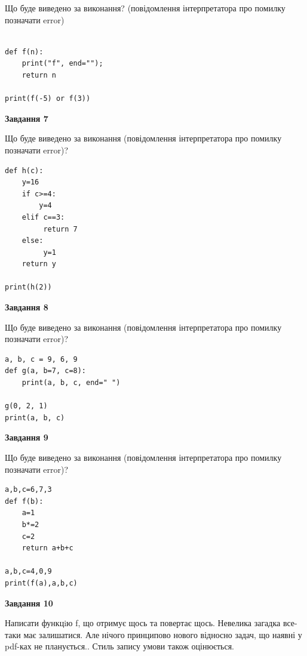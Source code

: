 \documentclass[12pt, ukrainian]{article}
\begin{document}
{\begin {large}
Що буде виведено за виконання? (повідомлення інтерпретатора про помилку позначати error)\par
\begin{verbatim}

def f(n):
    print("f", end="");
    return n

print(f(-5) or f(3))
\end{verbatim}

{\begin {center}\textbf{Завдання 7}\end {center}}

Що буде виведено за виконання (повідомлення інтерпретатора про помилку позначати error)?\par
\begin{verbatim}
def h(c):
    y=16
    if c>=4: 
        y=4
    elif c==3:
         return 7
    else:
         y=1
    return y

print(h(2))
\end{verbatim}

{\begin {center}\textbf{Завдання 8}\end {center}}

Що буде виведено за виконання (повідомлення інтерпретатора про помилку позначати error)?\par
\begin{verbatim}
a, b, c = 9, 6, 9
def g(a, b=7, c=8):
    print(a, b, c, end=" ")

g(0, 2, 1)
print(a, b, c)
\end{verbatim}

{\begin {center}\textbf{Завдання 9}\end {center}}

Що буде виведено за виконання (повідомлення інтерпретатора про помилку позначати error)?\par
\begin{verbatim}
a,b,c=6,7,3
def f(b):
    a=1
    b*=2
    c=2
    return a+b+c

a,b,c=4,0,9
print(f(a),a,b,c)
\end{verbatim}

{\begin {center}\textbf{Завдання 10}\end {center}}


Написати функцiю f, що отримує щось та повертає щось. Невелика загадка все-таки має залишатися. Але нічого принципово нового відносно задач, що наявні у pdf-ках не планується.. Стиль запису умови також оцінюється.\par
\end {large}}
\newpage
\end{document}
